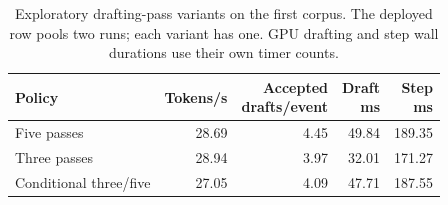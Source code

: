 \begin{table}[h]
\caption{Exploratory drafting-pass variants on the first corpus. The deployed row pools two runs; each variant has one. GPU drafting and step wall durations use their own timer counts.}
\label{tab:drafting-passes}
\centering\small
\setlength{\tabcolsep}{3pt}
\begin{tabular}{@{}lrrrr@{}}
\toprule
Policy & Tokens/s & \shortstack{Accepted\\drafts/event} & \shortstack{Draft\\ms} & \shortstack{Step\\ms} \\
\midrule
Five passes & 28.69 & 4.45 & 49.84 & 189.35 \\
Three passes & 28.94 & 3.97 & 32.01 & 171.27 \\
Conditional three/five & 27.05 & 4.09 & 47.71 & 187.55 \\
\bottomrule
\end{tabular}
\end{table}
